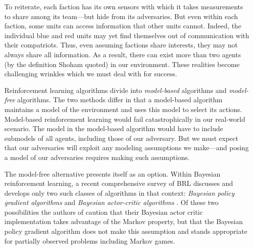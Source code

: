 \documentclass{article}
\begin{document}
To reiterate, each faction has its own sensors with which it takes
measurements to share among its team---but hide from its adversaries.
But even within each faction, some units can access information that
other units cannot.  Indeed, the individual blue and red units may yet
find themselves out of communication with their compatriots.  Thus,
even assuming factions share interests, they may not always share all
information.  As a result, there can exist more than two agents (by
the definition Shoham quoted) in our environment.  These realities
become challenging wrinkles which we must deal with for success.

Reinforcement learning algorithms divide into \emph{model-based}
algorithms and \emph{model-free} algorithms.  The two methods differ
in that a model-based algorithm maintains a model of the environment
and uses this model to select its actions.  Model-based reinforcement
learning would fail catastrophically in our real-world scenario.  The
model in the model-based algorithm would have to include submodels of
all agents, including those of our adversary.  But we must expect that
our adversaries will exploit any modeling assumptions we make---and
posing a model of our adversaries requires making such assumptions.

The model-free alternative presents itself as an option.  Within
Bayesian reinforcement learning, a recent comprehensive survey of BRL
\cite{ghavamzadeh2016bayesian} discusses and develops only two such
classes of algorithms in that context: \emph{Bayesian policy gradient
  algorithms} \cite{engel2007bayesian, ghavamzadeh2016abayesian} and
\emph{Bayesian actor-critic algorithms} \cite{ghavamzadeh2007bayesian,
  ghavamzadeh2016abayesian}.  Of these two possibilities the authors
of \cite{ghavamzadeh2016bayesian} caution that their Bayesian actor
critic implementation takes advantage of the Markov property, but that
the Bayesian policy gradient algorithm does not make this assumption
and stands appropriate for partially observed problems including
Markov games.
\end{document}
